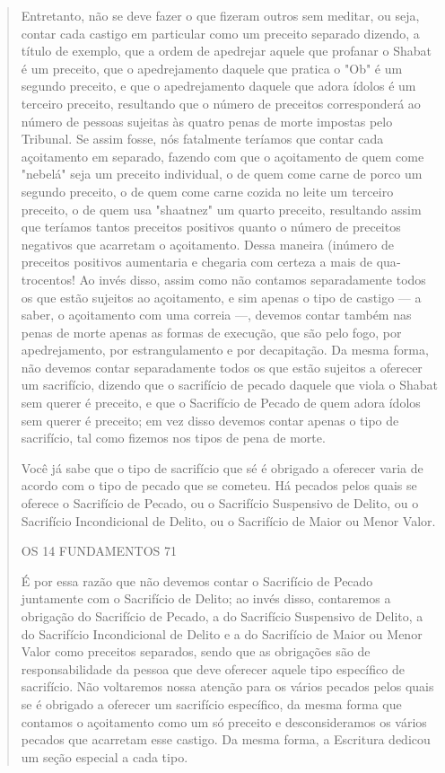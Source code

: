 \begin{quote}
Entretanto, não se deve fazer o que fizeram outros sem meditar, ou seja,
contar cada castigo em particular como um preceito separado dizendo, a
título de exemplo, que a ordem de apedrejar aquele que profanar o Shabat
é um preceito, que o apedrejamento daquele que pratica o "Ob" é um
segun­do preceito, e que o apedrejamento daquele que adora ídolos é um
terceiro preceito, resultando que o número de preceitos corresponderá ao
número de pessoas sujeitas às quatro penas de morte impostas pelo
Tribunal. Se assim fos­se, nós fatalmente teríamos que contar cada
açoitamento em separado, fazendo com que o açoitamento de quem come
"nebelá" seja um preceito individual, o de quem come carne de porco um
segundo preceito, o de quem come carne cozida no leite um terceiro
preceito, o de quem usa "shaatnez" um quarto pre­ceito, resultando assim
que teríamos tantos preceitos positivos quanto o núme­ro de preceitos
negativos que acarretam o açoitamento. Dessa maneira (inú­mero de
preceitos positivos aumentaria e chegaria com certeza a mais de
qua­trocentos! Ao invés disso, assim como não contamos separadamente
todos os que estão sujeitos ao açoitamento, e sim apenas o tipo de
castigo --- a saber, o açoitamento com uma correia ---, devemos contar
também nas penas de morte apenas as formas de execução, que são pelo
fogo, por apedrejamento, por es­trangulamento e por decapitação. Da
mesma forma, não devemos contar sepa­radamente todos os que estão
sujeitos a oferecer um sacrifício, dizendo que o sacrifício de pecado
daquele que viola o Shabat sem querer é preceito, e que o Sacrifício de
Pecado de quem adora ídolos sem querer é preceito; em vez disso devemos
contar apenas o tipo de sacrifício, tal como fizemos nos tipos de pena
de morte.

Você já sabe que o tipo de sacrifício que sé é obrigado a oferecer varia
de acordo com o tipo de pecado que se cometeu. Há pecados pelos quais se
oferece o Sacrifício de Pecado, ou o Sacrifício Suspensivo de Delito, ou
o Sacrifício Incondicional de Delito, ou o Sacrifício de Maior ou Menor
Valor.

OS 14 FUNDAMENTOS 71

É por essa razão que não devemos contar o Sacrifício de Pecado
juntamente com o Sacrifício de Delito; ao invés disso, contaremos a
obrigação do Sacrifí­cio de Pecado, a do Sacrifício Suspensivo de
Delito, a do Sacrifício Incondicio­nal de Delito e a do Sacrifício de
Maior ou Menor Valor como preceitos separa­dos, sendo que as obrigações
são de responsabilidade da pessoa que deve ofe­recer aquele tipo
específico de sacrifício. Não voltaremos nossa atenção para os vários
pecados pelos quais se é obrigado a oferecer um sacrifício específico,
da mesma forma que contamos o açoitamento como um só preceito e
descon­sideramos os vários pecados que acarretam esse castigo. Da mesma
forma, a Escritura dedicou um seção especial a cada tipo.


\end{quote}
